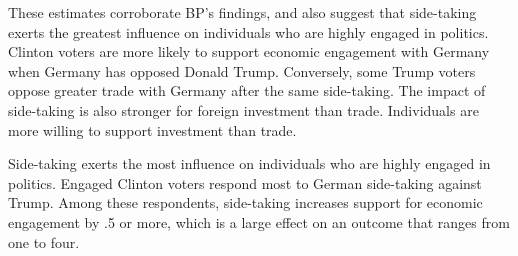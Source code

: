 \documentclass[12pt]{article}
\begin{document}
These estimates corroborate BP's findings, and also suggest that side-taking exerts the greatest influence on individuals who are highly engaged in politics. 
Clinton voters are more likely to support economic engagement with Germany when Germany has opposed Donald Trump. 
Conversely, some Trump voters oppose greater trade with Germany after the same side-taking. 
The impact of side-taking is also stronger for foreign investment than trade. 
Individuals are more willing to support investment than trade.


Side-taking exerts the most influence on individuals who are highly engaged in politics. 
Engaged Clinton voters respond most to German side-taking against Trump. 
Among these respondents, side-taking increases support for economic engagement by .5 or more, which is a large effect on an outcome that ranges from one to four. 


\singlespace
 
 
\end{document}
